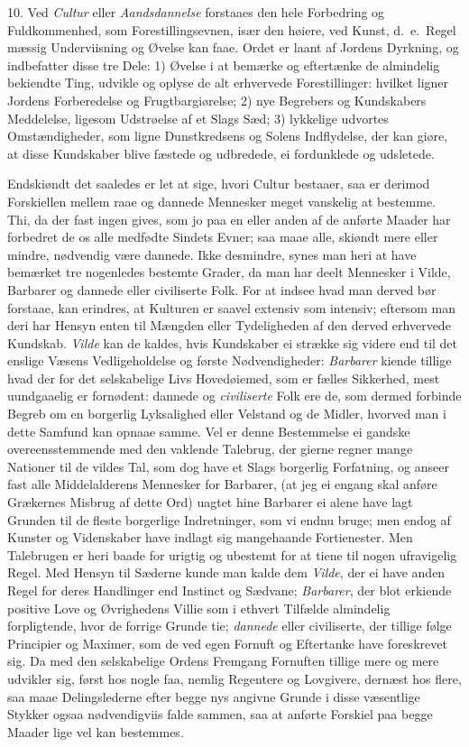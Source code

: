 \documentclass[12pt,a4paper]{article}
\newcommand{\opage}[1]{\marginnote{\footnotesize\textit{[#1]}}}
\begin{document}
10. Ved \emph{Cultur} eller \emph{Aandsdannelse} forstaaes den hele Forbedring og
Fuldkommenhed, som Forestillingsevnen, især den høiere, ved Kunst, d.~e.\ Regel%
\opage{176}mæssig Underviisning og Øvelse kan faae. Ordet er laant af Jordens Dyrkning, og
indbefatter disse tre Dele: 1) Øvelse i at bemærke og eftertænke de almindelig bekiendte
Ting, udvikle og oplyse de alt erhvervede Forestillinger: hvilket ligner Jordens
Forberedelse og Frugtbargiørelse; 2) nye Begrebers og Kundskabers Meddelelse, ligesom
Udstrøelse af et Slags Sæd; 3) lykkelige udvortes Omstændigheder, som ligne Dunstkredsens
og Solens Indflydelse, der kan giøre, at disse Kundskaber blive fæstede og udbredede, ei
fordunklede og udsletede.

Endskiøndt det saaledes er let at sige, hvori Cultur bestaaer, saa er derimod Forskiellen
mellem raae og dannede Mennesker meget vanskelig at bestemme. Thi, da der fast ingen
gives, som jo paa en eller anden af de anførte Maader har forbedret de os alle medfødte
Sindets Evner; saa maae alle, skiøndt mere eller mindre, nødvendig være dannede. Ikke
desmindre, synes man heri at have bemærket tre nogenledes bestemte Grader, da man har
deelt Mennesker i Vilde, Barbarer og dannede eller civiliserte Folk. For at indsee hvad
man derved bør forstaae, kan erindres, at Kulturen er saavel extensiv som intensiv;
eftersom man deri har Hensyn enten til Mængden eller Tydeligheden af den derved erhvervede
Kundskab. \emph{Vilde} kan de kaldes, hvis Kundskaber ei strække sig videre end til det
enslige Væsens Vedligeholdelse og første Nødvendigheder: \emph{Barbarer} kiende tillige
hvad
\opage{177} der for det selskabelige Livs Hovedøiemed, som er fælles Sikkerhed, mest uundgaaelig er
fornødent: dannede og \emph{civiliserte} Folk ere de, som dermed forbinde Begreb om en
borgerlig Lyksalighed eller Velstand og de Midler, hvorved man i dette Samfund kan opnaae
samme. Vel er denne Bestemmelse ei gandske overeensstemmende med den vaklende Talebrug,
der gierne regner mange Nationer til de vildes Tal, som dog have et Slags borgerlig
Forfatning, og anseer fast alle Middelalderens Mennesker for Barbarer, (at jeg ei engang
skal anføre Grækernes Misbrug af dette Ord) uagtet hine Barbarer ei alene have lagt
Grunden til de fleste borgerlige Indretninger, som vi endnu bruge; men endog af Kunster og
Videnskaber have indlagt sig mangehaande Fortienester. Men Talebrugen er heri baade for
urigtig og ubestemt for at tiene til nogen ufravigelig Regel. Med Hensyn til Sæderne kunde
man kalde dem \emph{Vilde}, der ei have anden Regel for deres Handlinger end Instinct og
Sædvane; \emph{Barbarer}, der blot erkiende positive Love og Øvrighedens Villie som i
ethvert Tilfælde almindelig forpligtende, hvor de forrige Grunde tie; \emph{dannede} eller
civiliserte, der tillige følge Principier og Maximer, som de ved egen Fornuft og Eftertanke
have foreskrevet sig. Da med den selskabelige Ordens Fremgang Fornuften tillige mere og
mere udvikler sig, først hos nogle faa, nemlig Regentere og Lovgivere, dernæst hos
\opage{178} flere, saa maae Delingslederne efter begge nys angivne Grunde i disse væsentlige Stykker
ogsaa nødvendigviis falde sammen, saa at anførte Forskiel paa begge Maader lige vel kan
bestemmes.
\end{document}
